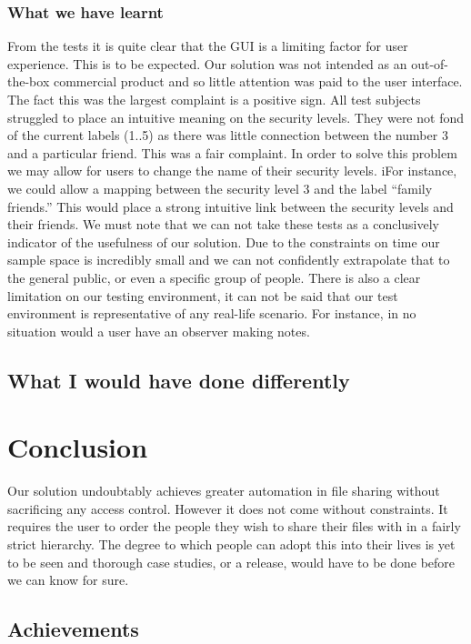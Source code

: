 \documentclass[12pt, titlepage]{article}
\begin{document}
\subsubsection{What we have learnt}
From the tests it is quite clear that the GUI is a limiting factor for user experience. This is to be expected. Our solution was not intended as an out-of-the-box commercial product and so little attention was paid to the user interface. The fact this was the largest complaint is a positive sign.
\newline \indent All test subjects struggled to place an intuitive meaning on the security levels. They were not fond of the current labels (1..5) as there was little connection between the number 3 and a particular friend. This was a fair complaint. In order to solve this problem we may allow for users to change the name of their security levels. iFor instance, we could allow a mapping between the security level 3 and the label ``family friends.'' This would place a strong intuitive link between the security levels and their friends.
\newline \indent We must note that we can not take these tests as a conclusively indicator of the usefulness of our solution. Due to the constraints on time our sample space is incredibly small and we can not confidently extrapolate that to the general public, or even a specific group of people. There is also a clear limitation on our testing environment, it can not be said that our test environment is representative of any real-life scenario. For instance, in no situation would a user have an observer making notes.

\subsection{What I would have done differently}

\section{Conclusion}
Our solution undoubtably achieves greater automation in file sharing without sacrificing any access control. However it does not come without constraints. It requires the user to order the people they wish to share their files with in a fairly strict hierarchy. The degree to which people can adopt this into their lives is yet to be seen and thorough case studies, or a release, would have to be done before we can know for sure.

\subsection{Achievements}
\end{document}
